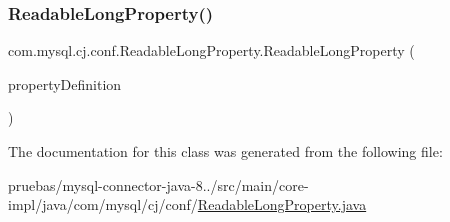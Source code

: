 \subsubsection{\texorpdfstring{Readable\+Long\+Property()}{ReadableLongProperty()}}
{\footnotesize\ttfamily com.\+mysql.\+cj.\+conf.\+Readable\+Long\+Property.\+Readable\+Long\+Property (\begin{DoxyParamCaption}\item[{\mbox{\hyperlink{interfacecom_1_1mysql_1_1cj_1_1conf_1_1_property_definition}{Property\+Definition}}$<$ Long $>$}]{property\+Definition }\end{DoxyParamCaption})\hspace{0.3cm}{\ttfamily [protected]}}



The documentation for this class was generated from the following file\+:\begin{DoxyCompactItemize}
\item 
pruebas/mysql-\/connector-\/java-\/8../src/main/core-\/impl/java/com/mysql/cj/conf/\mbox{\hyperlink{_readable_long_property_8java}{Readable\+Long\+Property.\+java}}\end{DoxyCompactItemize}
